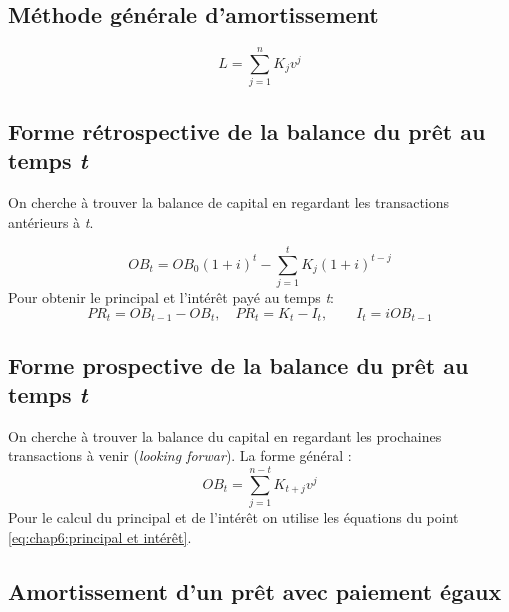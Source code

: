 \documentclass[11pt,french]{report}
\begin{document}
\subsection{Méthode générale d'amortissement}
\label{sec:amortissement général}

\begin{equation}
L = \sum_{j=1}^{n}K_{j}v^{j}
\end{equation}

\subsection{Forme rétrospective de la balance du prêt au temps \textit{t}}
\label{sec:rétrospective}

On cherche à trouver la balance de capital en regardant les transactions antérieurs à \textit{t}.

\begin{equation}
OB_t = OB_0(1+i)^{t} - \sum_{j=1}^{t}K_j(1+i)^{t-j}
\end{equation}
Pour obtenir le principal et l'intérêt payé au temps \textit{t}:
\begin{equation}
\label{eq:chap6:principal et intérêt}
PR_t = OB_{t-1}- OB_t, \quad PR_t = K_t - I_t, \qquad I_t = iOB_{t-1} 
\end{equation}

\subsection{Forme prospective de la balance du prêt au temps \textit{t}}
\label{sec:prospective}

On cherche à trouver la balance du capital en regardant les prochaines transactions à venir (\textit{looking forwar}). La forme général :
\begin{equation}
OB_t = \sum_{j=1}^{n-t}K_{t+j}v^{j}
\end{equation}
Pour le calcul du principal et de l'intérêt on utilise les équations du point \ref{eq:chap6:principal et intérêt}.

\subsection{Amortissement d'un prêt avec paiement égaux}
\label{sec:amortissement prêt}
\end{document}
